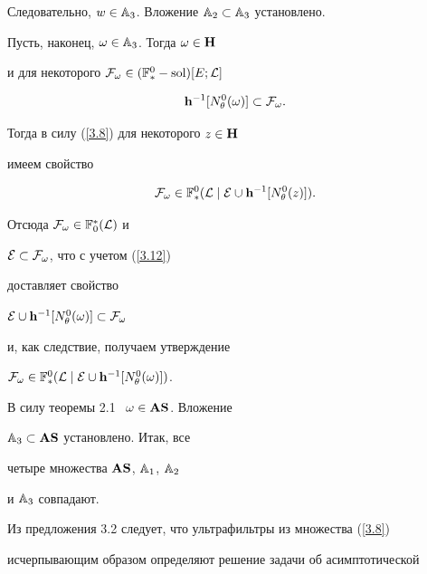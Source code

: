 {\begin{pf}
Следовательно, $w \in {{\Bbb A}_3}$. Вложение ${{\Bbb A}_2} \subset


{{\Bbb A}_3}$ установлено.





Пусть, наконец, $\omega \in {{\Bbb A}_3}$. Тогда $\omega \in {\bold H}$


и для некоторого ${\cal F}_\omega \in ({{\Bbb F}_*^0}-\operatorname{sol})[E;{\cal L}]$


\begin{equation}\label{3.12}


{{\bold h}^{-1}}[{N_\theta^0}(\omega)] \subset {{\cal F}_\omega}.


\end{equation}


Тогда в силу (\ref{3.8}) для некоторого $z \in {\bold H}$


имеем свойство


$$


{{\cal F}_\omega} \in {{\Bbb F}_*^0}({\cal L}\mid{\cal E}\cup{{\bold


h}^{-1}}[{N_\theta^0}(z)]).


$$


Отсюда ${{\cal F}_\omega} \in {{\Bbb F}_0^*}({\cal L})$ и


${\cal E} \subset {{\cal F}_\omega}$, что с учетом (\ref{3.12})


доставляет свойство


${\cal E}\cup{{\bold h}^{-1}}[{N_\theta^0}(\omega)] \subset {{\cal F}_\omega}$


и, как следствие, получаем утверждение


${{\cal F}_\omega} \in {{\Bbb F}_*^0}({\cal L}\mid{\cal E}\cup{{\bold


h}^{-1}}[{N_\theta^0}(\omega)])$.


В силу теоремы 2.1 \ $\omega \in {{\bold A}{\bold S}}$. Вложение


${{\Bbb A}_3} \subset {{\bold A}{\bold S}}$ установлено. Итак, все


четыре множества ${{\bold A}{\bold S}}$, ${{\Bbb A}_1}$, ${{\Bbb A}_2}$


и ${\Bbb A}_3$ совпадают.


\end{pf}





Из предложения 3.2 следует, что ультрафильтры из множества (\ref{3.8})


исчерпывающим образом определяют решение задачи об асимптотической


}
